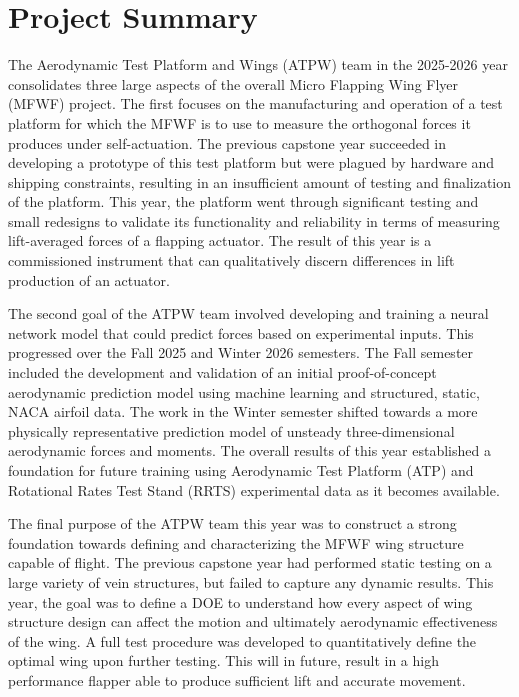 \chapter{Project Summary}
\sffamily
\label{chap:Project Summary}
The Aerodynamic Test Platform and Wings (ATPW) team in the 2025-2026 year consolidates three large aspects of the overall Micro Flapping Wing Flyer (MFWF) project. The first focuses on the manufacturing and operation of a test platform for which the MFWF is to use to measure the orthogonal forces it produces under self-actuation. The previous capstone year succeeded in developing a prototype of this test platform but were plagued by hardware and shipping constraints, resulting in an insufficient amount of testing and finalization of the platform. This year, the platform went through significant testing and small redesigns to validate its functionality and reliability in terms of measuring lift-averaged forces of a flapping actuator. The result of this year is a commissioned instrument that can qualitatively discern differences in lift production of an actuator.

The second goal of the ATPW team involved developing and training a neural network model that could predict forces based on experimental inputs. This progressed over the Fall 2025 and Winter 2026 semesters. The Fall semester included the development and validation of an initial proof-of-concept aerodynamic prediction model using machine learning and structured, static, NACA airfoil data. The work in the Winter semester shifted towards a more physically representative prediction model of unsteady three-dimensional aerodynamic forces and moments. The overall results of this year established a foundation for future training using Aerodynamic Test Platform (ATP) and Rotational Rates Test Stand (RRTS) experimental data as it becomes available.

The final purpose of the ATPW team this year was to construct a strong foundation towards defining and characterizing the MFWF wing structure capable of flight. The previous capstone year had performed static testing on a large variety of vein structures, but failed to capture any dynamic results. This year, the goal was to define a DOE to understand how every aspect of wing structure design can affect the motion and ultimately aerodynamic effectiveness of the wing. A full test procedure was developed to quantitatively define the optimal wing upon further testing. This will in future, result in a high performance flapper able to produce sufficient lift and accurate movement.


